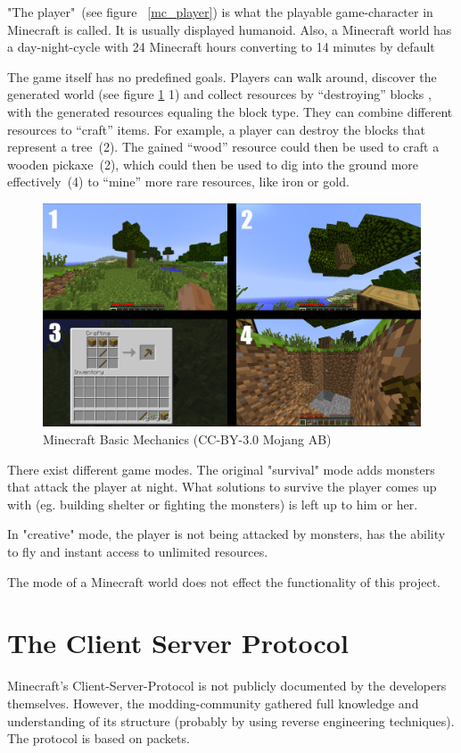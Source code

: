 "The player"~(see figure ~\ref{mc_player}) is what the playable game-character in Minecraft is called. It is usually displayed humanoid.
Also, a Minecraft world has a day-night-cycle with 24 Minecraft hours converting to 14 minutes by default

The game itself has no predefined goals. Players can walk around, discover the generated world (see figure \ref{mc_mechanics} 1) and collect resources by ``destroying'' blocks , with the generated resources equaling the block type. They can combine different resources to ``craft'' items. For example, a player can destroy the blocks that represent a tree~(2). The gained ``wood'' resource could then be used to craft a wooden pickaxe~(2), which could then be used to dig into the ground more effectively~(4) to ``mine'' more rare resources, like iron or gold.

\begin{figure}[h]
  \centering
    \includegraphics[width=15cm]{graphics/minecraft_mechanics}
  \caption{Minecraft Basic Mechanics  (CC-BY-3.0 Mojang AB)} %
  \label{mc_mechanics}
\end{figure}

There exist different game modes. The original "survival" mode adds monsters that attack the player at night. What solutions to survive the player comes up with (eg. building shelter or fighting the monsters) is left up to him or her.

In "creative" mode, the player is not being attacked by monsters, has the ability to fly and instant access to unlimited resources.

The mode of a Minecraft world does not effect the functionality of this project.

        \section{The Client Server Protocol}
Minecraft's Client-Server-Protocol is not publicly documented by the developers themselves. However, the modding-community gathered full knowledge and understanding of its structure (probably by using reverse engineering techniques). The protocol is based on packets. 


